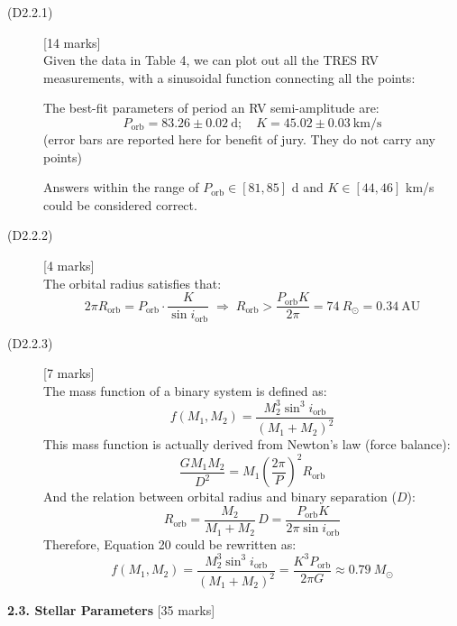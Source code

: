 \begin{description}
\item[(D2.2.1)] \hfill[14 marks]\\
  Given the data in Table 4, we can plot out all the TRES RV measurements,
  with a sinusoidal function connecting all the points:

  The best-fit parameters of period an RV semi-amplitude are:
  \[ P_{\mathrm{orb}} = 83.26 \pm 0.02\ \mathrm{d};\quad
     K = 45.02 \pm 0.03\ \mathrm{km/s} \tag*{(18)} \]
  (error bars are reported here for benefit of jury. They do not carry any
  points)

  Answers within the range of $P_{\mathrm{orb}} \in [81, 85]$ d and
  $K \in [44, 46]$ km/s could be considered correct.

\item[(D2.2.2)] \hfill[4 marks]\\
  The orbital radius satisfies that:
  \[ 2\pi R_{\mathrm{orb}} = P_{\mathrm{orb}} \cdot
     \frac{K}{\sin i_{\mathrm{orb}}}
     \;\Rightarrow\;
     R_{\mathrm{orb}} > \frac{P_{\mathrm{orb}} K}{2\pi}
     = 74\ R_\odot = 0.34\ \mathrm{AU} \tag*{(19)} \]

\item[(D2.2.3)] \hfill[7 marks]\\
  The mass function of a binary system is defined as:
  \[ f(M_1, M_2) = \frac{M_2^3 \sin^3 i_{\mathrm{orb}}}
     {(M_1 + M_2)^2} \tag*{(20)} \]
  This mass function is actually derived from Newton's law (force balance):
  \[ \frac{G M_1 M_2}{D^2}
     = M_1 \left( \frac{2\pi}{P} \right)^2 R_{\mathrm{orb}} \tag*{(21)} \]
  And the relation between orbital radius and binary separation ($D$):
  \[ R_{\mathrm{orb}} = \frac{M_2}{M_1 + M_2}\,D
     = \frac{P_{\mathrm{orb}} K}{2\pi \sin i_{\mathrm{orb}}} \tag*{(22)} \]
  Therefore, Equation 20 could be rewritten as:
  \[ f(M_1, M_2) = \frac{M_2^3 \sin^3 i_{\mathrm{orb}}}{(M_1 + M_2)^2}
     = \frac{K^3 P_{\mathrm{orb}}}{2\pi G}
     \approx 0.79\ M_\odot \tag*{(23)} \]
\end{description}

\medskip
\noindent\textbf{2.3. Stellar Parameters} \hfill[35 marks]

